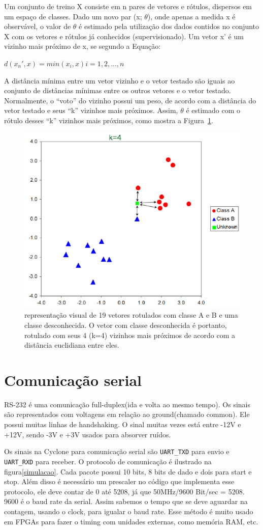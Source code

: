 \documentclass[12pt]{article}
\begin{document}
Um conjunto de treino X consiste em n pares de vetores e rótulos, dispersos em
um espaço de classes. Dado um novo par (x; $\theta$), onde apenas a medida x é
observável, o valor de $\theta$	é estimado pela utilização dos dados contidos
no conjunto X com os vetores e rótulos já conhecidos (supervisionado). Um vetor
x' é um vizinho mais próximo de x, se segundo a Equação:

$d(x_{n}', x) = min(x_i, x) i = 1, 2, ...,n$

A distância mínima entre um vetor vizinho e o vetor testado são iguais ao 
conjunto de distâncias mínimas entre os outros vetores e o vetor testado. 
Normalmente, o ``voto'' do vizinho possui um peso, de acordo com a distância do
vetor testado e seus ``k'' vizinhos mais próximos. Assim, $\theta$ é estimado com o rótulo desses ``k'' vizinhos mais próximos,
como mostra a Figura~\ref{fig:fig1}.

\begin{figure}[!ht]
	\centering
	\includegraphics[width=.5\textwidth]{img/knn.png}
	\caption{representação visual de 19 vetores rotulados com classe A e B e uma
	classe desconhecida. O vetor com classe desconhecida é portanto, rotulado
	com seus 4 (k=4) vizinhos mais próximos de acordo com a distância euclidiana
	entre eles.}
	\label{fig:fig1}
\end{figure}

\section{Comunicação serial}

RS-232 é uma comunicação full-duplex(ida e volta ao mesmo tempo). Os sinais são
representados com voltagens em relação ao ground(chamado common). Ele possui 
muitas linhas de handshaking. O sinal muitas vezes está entre -12V e +12V,
sendo -3V e +3V usados para absorver ruídos.

Os sinais na Cyclone para comunicação serial são \verb|UART_TXD| para envio e
\verb|UART_RXD| para receber. O protocolo de comunicação é ilustrado na 
figura\ref{simulacao}. Cada pacote possui 10 bits, 8 bits de dado e dois para
start e stop. Além disso é necessário um prescaler no código que implementa esse
protocolo, ele deve contar de 0 até 5208, já que 50MHz/9600 Bit/sec = 5208. 9600
é o baud rate da serial. Assim sabemos o tempo que se deve aguardar na contagem,
usando o clock, para igualar o baud rate. Esse método é muito usado em FPGAs
para fazer o timing com unidades externas, como memória RAM, etc.
\end{document}
